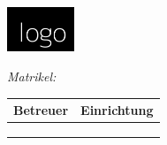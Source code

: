 \makeatletter
\begin{titlepage}
	\centering
	\includegraphics[width=0.15\textwidth]{05_resources/image/logo}\par
	\vfill
	{\scshape\Large \uni\par}
	{\scshape\large \course\par} 
	\vfill
	{\scshape\Large \paper\par} 
	\vfill
	{\LARGE\bfseries \@title\par}
	\vfill
	{\Large\itshape \@author\par} 
	{\itshape Matrikel: \register\par}
	\vfill
	{\large\itshape \semester}
	\vfill

	\begin{tabular}[c]{l@{\hskip 10mm}l@{\hskip 5mm}}
	Betreuer & Einrichtung \\
	\hline
	\rule{0pt}{3.5ex}\noindent
	\fprofessor & \uni \\
	\sprofessor & \uni \\
	\tutor & \company \\
	\end{tabular}

	\vfill

	{\large \@date\par}

\end{titlepage}
\makeatother
